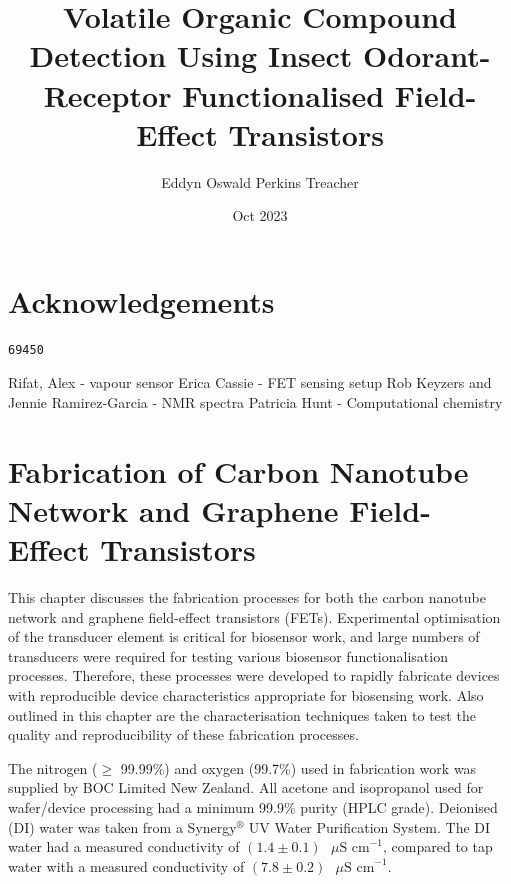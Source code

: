 \documentclass[
  a4paper,
]{scrbook}
\title{Volatile Organic Compound Detection Using Insect Odorant-Receptor
Functionalised Field-Effect Transistors}
\author{Eddyn Oswald Perkins Treacher}
\date{Oct 2023}
\begin{document}
\frontmatter
\maketitle
\ifdefined\Shaded\renewenvironment{Shaded}{\begin{tcolorbox}[frame hidden, borderline west={3pt}{0pt}{shadecolor}, breakable, interior hidden, boxrule=0pt, enhanced, sharp corners]}{\end{tcolorbox}}\fi

\mainmatter
{}

\hypertarget{acknowledgements}{%
\chapter*{Acknowledgements}\label{acknowledgements}}


\begin{verbatim}
69450
\end{verbatim}

Rifat, Alex - vapour sensor Erica Cassie - FET sensing setup Rob Keyzers
and Jennie Ramirez-Garcia - NMR spectra Patricia Hunt - Computational
chemistry


\hypertarget{sec-fabrication}{%
\chapter{Fabrication of Carbon Nanotube Network and Graphene
Field-Effect Transistors}\label{sec-fabrication}}

This chapter discusses the fabrication processes for both the carbon
nanotube network and graphene field-effect transistors (FETs).
Experimental optimisation of the transducer element is critical for
biosensor work, and large numbers of transducers were required for
testing various biosensor functionalisation processes. Therefore, these
processes were developed to rapidly fabricate devices with reproducible
device characteristics appropriate for biosensing work. Also outlined in
this chapter are the characterisation techniques taken to test the
quality and reproducibility of these fabrication processes.

The nitrogen (\(\geq\) 99.99\%) and oxygen (99.7\%) used in fabrication
work was supplied by BOC Limited New Zealand. All acetone and
isopropanol used for wafer/device processing had a minimum 99.9\% purity
(HPLC grade). Deionised (DI) water was taken from a
Synergy\(^\circledR\) UV Water Purification System. The DI water had a
measured conductivity of
\((1.4\pm0.1)\textrm{ } \mu \textrm{S cm}^{-1}\), compared to tap water
with a measured conductivity of
\((7.8\pm0.2)\textrm{ } \mu \textrm{S cm}^{-1}\).
\end{document}
